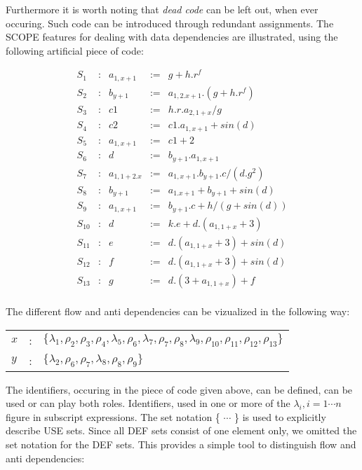 Furthermore it is worth noting that {\em dead code} can be left out, when
ever occuring. Such code can be introduced through redundant assignments.
The SCOPE features for dealing with data dependencies are illustrated, using
the following artificial piece of code:
\begin{center}
\[ \begin{array}{lclcl}
 S_1 & : & a_{1,x+1} & := & g + h . r^f \\
 S_2 & : & b_{y+1} & := & a_{1, 2.x+1} .(g + h . r^f) \\
 S_3 & : & c1 & := &  h.r. a_{2,1+x}/g \\
 S_4 & : & c2 & := & c1 . a_{1,x+1} + sin(d) \\
 S_5 & : & a_{1,x+1} & := & c1 + 2 \\
 S_6 & : & d & := & b_{y+1} . a_{1,x+1} \\
 S_7 & : & a_{1,1+2.x} & := & a_{1,x+1} . b_{y+1} . c/(d . g^2)  \\
 S_8 & : & b_{y+1} & := & a_{1.x+1} + b_{y+1} + sin(d) \\
 S_9 & : & a_{1,x+1} & := & b_{y+1} . c + h/(g  + sin(d))\\
 S_{10} & : & d & := & k . e + d . (a_{1,1+x} + 3) \\
 S_{11} & : & e & := &  d . (a_{1,1+x} + 3) + sin(d) \\
 S_{12} & : & f & := &  d . (a_{1,1+x} + 3) + sin(d) \\
 S_{13} & : & g & := &  d . (3 + a_{1,1+x}) + f \\
\end{array}\]
\end{center}

The different flow and anti dependencies can be vizualized in the following way:
\begin{center}
\begin{tabular}{lcl}
 $x$ & : & $\{ {\lambda}_1 , {\rho}_2 , {\rho}_3 , {\rho}_4 , {\lambda}_5 ,
 {\rho}_6 , {\lambda}_7 , {\rho}_7 , {\rho}_8 ,{\lambda}_9 , {\rho}_{10} ,
 {\rho}_{11} , {\rho}_{12} , {\rho}_{13} \}$ \\
 $y$ & : & $\{ {\lambda}_2 , {\rho}_6 , {\rho}_7 , {\lambda}_8 , {\rho}_8 ,
 {\rho}_9 \}$
\end{tabular}
\end{center}

The identifiers, occuring in the piece of code given above, can be defined,
can be used or can play both roles. Identifiers, used in one or more of the
$\lambda_i , i = 1 \cdots n$ figure in subscript expressions. The set
notation \{ $\cdots$ \} is used to explicitly describe USE sets. Since
all DEF sets consist of one element only, we omitted the set notation for the
DEF sets. This provides a simple tool to distinguish flow and anti dependencies:

